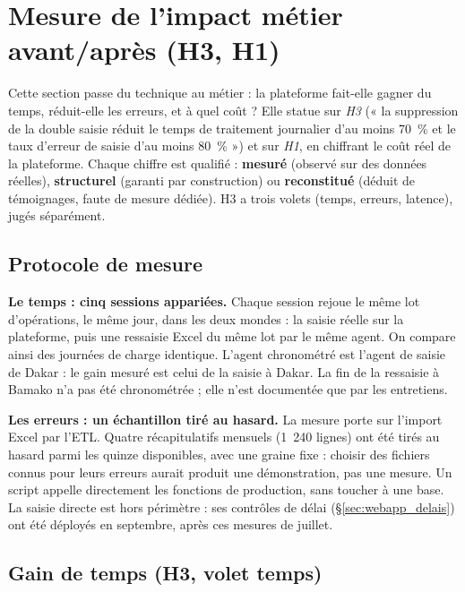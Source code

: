 \section{Mesure de l'impact métier avant/après (H3, H1)}
\label{chap:impact_metier}

Cette section passe du technique au métier : la plateforme fait-elle gagner du temps, réduit-elle les erreurs, et à quel coût ? Elle statue sur \emph{H3} (« la suppression de la double saisie réduit le temps de traitement journalier d'au moins 70~\% et le taux d'erreur de saisie d'au moins 80~\% ») et sur \emph{H1}, en chiffrant le coût réel de la plateforme. Chaque chiffre est qualifié : \textbf{mesuré} (observé sur des données réelles), \textbf{structurel} (garanti par construction) ou \textbf{reconstitué} (déduit de témoignages, faute de mesure dédiée). H3 a trois volets (temps, erreurs, latence), jugés séparément.

\subsection{Protocole de mesure}
\label{sec:impact_protocole}

\textbf{Le temps : cinq sessions appariées.} Chaque session rejoue le même lot d'opérations, le même jour, dans les deux mondes : la saisie réelle sur la plateforme, puis une ressaisie Excel du même lot par le même agent. On compare ainsi des journées de charge identique. L'agent chronométré est l'agent de saisie de Dakar : le gain mesuré est celui de la saisie à Dakar. La fin de la ressaisie à Bamako n'a pas été chronométrée ; elle n'est documentée que par les entretiens.

\textbf{Les erreurs : un échantillon tiré au hasard.} La mesure porte sur l'import Excel par l'ETL. Quatre récapitulatifs mensuels (1~240 lignes) ont été tirés au hasard parmi les quinze disponibles, avec une graine fixe : choisir des fichiers connus pour leurs erreurs aurait produit une démonstration, pas une mesure. Un script appelle directement les fonctions de production, sans toucher à une base. La saisie directe est hors périmètre : ses contrôles de délai (\S\ref{sec:webapp_delais}) ont été déployés en septembre, après ces mesures de juillet.

\subsection{Gain de temps (H3, volet temps)}
\label{sec:impact_temps}


